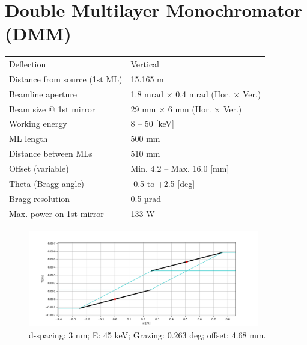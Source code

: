 \section{Double Multilayer Monochromator (DMM)}
\vspace*{-\baselineskip}
\begin{center}
\begin{table} [ht]
\small
\begin{tabular}[bhp]{|p{} | p{}|}
\hline
Deflection & Vertical \\
Distance from source (1st ML) & 15.165 m \\
Beamline aperture & 1.8 mrad × 0.4 mrad (Hor. × Ver.) \\
Beam size @ 1st mirror & 29 mm × 6 mm (Hor. × Ver.) \\
Working energy & 8 – 50 [keV] \\
ML length & 500 mm \\
Distance between MLs & 510 mm \\
Offset (variable) & Min. 4.2 – Max. 16.0 [mm] \\
Theta (Bragg angle) & -0.5 to +2.5 [deg] \\
Bragg resolution & 0.5 µrad \\
Max. power on 1st mirror & 133 W \\
\hline
\end{tabular}
\label{tab:DMM_general}
\end{table}
\end{center}

\setlength{\belowcaptionskip}{-15pt}
\vspace*{-\baselineskip}

\begin{figure} [!ht]
\centering
\includegraphics[width=0.9\textwidth]{./../figures/operation/DMM_mirrors_d3_E45_gr0.263_offset4.68.png}
\caption{\label{fig:DMM_mirrors_45keV} d-spacing: 3 nm; E: 45 keV; Grazing: 0.263 deg; offset: 4.68 mm.}
\end{figure}

